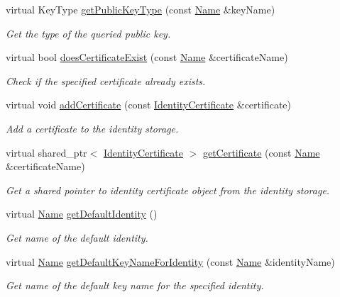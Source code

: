 \begin{DoxyCompactItemize}
virtual Key\+Type \hyperlink{classndn_1_1SecPublicInfoSqlite3_a3c394ba57577a6229703c36730453b33}{get\+Public\+Key\+Type} (const \hyperlink{classndn_1_1Name}{Name} \&key\+Name)
\begin{DoxyCompactList}\small\item\em Get the type of the queried public key. \end{DoxyCompactList}\item 
virtual bool \hyperlink{classndn_1_1SecPublicInfoSqlite3_ad922d89d93fe325b1be35caa2397473e}{does\+Certificate\+Exist} (const \hyperlink{classndn_1_1Name}{Name} \&certificate\+Name)
\begin{DoxyCompactList}\small\item\em Check if the specified certificate already exists. \end{DoxyCompactList}\item 
virtual void \hyperlink{classndn_1_1SecPublicInfoSqlite3_ad594eb3b788ae00452f2c17f1a5a02f4}{add\+Certificate} (const \hyperlink{classndn_1_1IdentityCertificate}{Identity\+Certificate} \&certificate)
\begin{DoxyCompactList}\small\item\em Add a certificate to the identity storage. \end{DoxyCompactList}\item 
virtual shared\+\_\+ptr$<$ \hyperlink{classndn_1_1IdentityCertificate}{Identity\+Certificate} $>$ \hyperlink{classndn_1_1SecPublicInfoSqlite3_a24d261d01754ca0f7ca756a7833ecb31}{get\+Certificate} (const \hyperlink{classndn_1_1Name}{Name} \&certificate\+Name)
\begin{DoxyCompactList}\small\item\em Get a shared pointer to identity certificate object from the identity storage. \end{DoxyCompactList}\item 
virtual \hyperlink{classndn_1_1Name}{Name} \hyperlink{classndn_1_1SecPublicInfoSqlite3_ad89a572966e29dc22723a7b4289be7ba}{get\+Default\+Identity} ()
\begin{DoxyCompactList}\small\item\em Get name of the default identity. \end{DoxyCompactList}\item 
virtual \hyperlink{classndn_1_1Name}{Name} \hyperlink{classndn_1_1SecPublicInfoSqlite3_a069cd5be69319a54a03c7cf7b2b3350c}{get\+Default\+Key\+Name\+For\+Identity} (const \hyperlink{classndn_1_1Name}{Name} \&identity\+Name)
\begin{DoxyCompactList}\small\item\em Get name of the default key name for the specified identity. \end{DoxyCompactList}\item 

\end{DoxyCompactItemize}
